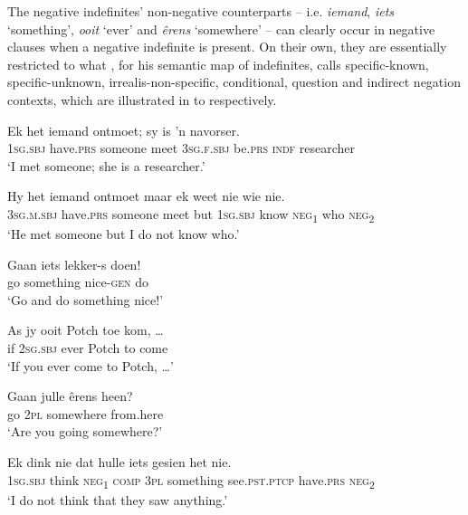 \documentclass[output=paper,colorlinks,citecolor=brown]{langscibook}
\begin{document}
The negative indefinites’ non-negative counterparts – i.e. \textit{iemand}, \textit{iets} ‘something’, \textit{ooit} ‘ever’ and \textit{êrens} ‘somewhere’ – can clearly occur in negative clauses when a negative indefinite is present. On their own, they are essentially restricted to what \citet[31--52]{Haspelmath1997}, for his semantic map of indefinites, calls specific-known, specific-unknown, irrealis-non-specific, conditional, question and indirect negation contexts, which are illustrated in  to  respectively.

\ea\label{ex:afr:31}
    \ea\label{ex:afr:31a}
        \gll Ek het iemand ontmoet; sy is ’n navorser. \\ 
             1\textsc{sg.sbj} have.\textsc{prs} someone meet \textsc{3sg.f.sbj} be.\textsc{prs} \textsc{indf} researcher \\
        \glt ‘I met someone; she is a researcher.’
    
    \ex\label{ex:afr:31b}
        \gll Hy het iemand ontmoet maar ek weet nie wie nie. \\
             \textsc{3sg.m.sbj} have.\textsc{prs} someone meet but \textsc{1sg.sbj} know  \textsc{neg}\textsubscript{1} who  \textsc{neg}\textsubscript{2}\\
        \glt ‘He met someone but I do not know who.’
 
    \ex\label{ex:afr:31c}
        \gll Gaan iets lekker-s doen! \\ 
             go something nice-\textsc{gen} do \\
        \glt ‘Go and do something nice!’
    
    \ex\label{ex:afr:31d}
        \gll As jy ooit Potch toe kom, … \\ 
             if \textsc{2sg.sbj} ever Potch to come\\
        \glt ‘If you ever come to Potch, …’

    \ex\label{ex:afr:31e}
        \gll Gaan julle êrens heen? \\ 
             go \textsc{2pl} somewhere from.here \\
        \glt ‘Are you going somewhere?’
    
    \ex\label{ex:afr:31f}
        \gll Ek dink nie dat hulle iets gesien het nie. \\
             \textsc{1sg.sbj} think \textsc{neg}\textsubscript{1} \textsc{comp} \textsc{3pl} something  see.\textsc{pst.ptcp} have.\textsc{prs} \textsc{neg}\textsubscript{2} \\
        \glt ‘I do not think that they saw anything.’
    
\end{document}
